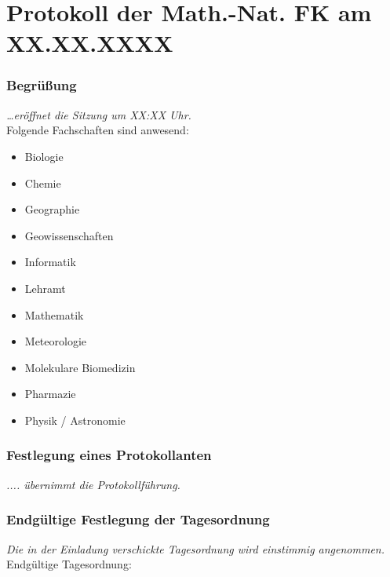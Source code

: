\documentclass [titlepage] {article}
\begin{document}
\newcommand{\vote}[3]{
	\hspace{1ex} \textit{\normalsize{Abstimmung:}} \\[1mm] 
	\begin{tabular}{c|c|c}
		\scriptsize Ja& \scriptsize Nein& \scriptsize Enthaltung \\
		\rule{0pt}{12pt}
		\Large  #1& \Large #2 &\Large #3
	\end{tabular}
	\normalsize}
\newcommand{\verfahren}[1]{
	\textit{#1} \vspace{2mm} }

\part*{Protokoll der Math.-Nat. FK am XX.XX.XXXX}
\section{Begrüßung}
\verfahren{\dots eröffnet die Sitzung um XX:XX Uhr.}\\
Folgende Fachschaften sind anwesend:
\begin{itemize}
	\setlength\itemsep{0,5mm}
	\item Biologie
	\item Chemie
	\item Geographie
	\item Geowissenschaften
	\item Informatik
	\item Lehramt			
	\item Mathematik
	\item Meteorologie
	\item Molekulare Biomedizin
	\item Pharmazie
	\item Physik / Astronomie
\end{itemize}

\section{Festlegung eines Protokollanten}
\verfahren{.... übernimmt die Protokollführung.}

\section{Endgültige Festlegung der Tagesordnung}
\verfahren{Die in der Einladung verschickte Tagesordnung wird einstimmig angenommen.}\\
Endgültige Tagesordnung:
\end{document}
